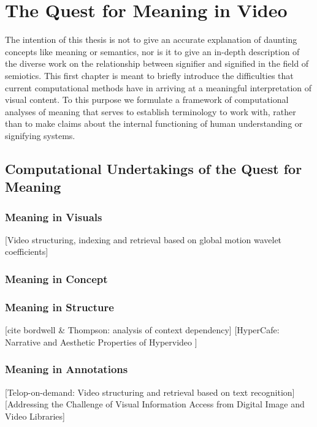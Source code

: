 \chapter{The Quest for Meaning in Video}
\label{ch:quest}

 

The intention of this thesis is not to give an accurate explanation of daunting concepts like meaning or semantics, nor is it to give an in-depth description of the diverse work on the relationship between signifier and signified in the field of semiotics. This first chapter is meant to briefly introduce the difficulties that current computational methods have in arriving at a meaningful interpretation of visual content. To this purpose we formulate a framework of computational analyses of meaning that serves to establish terminology to work with, rather than to make claims about the internal functioning of human understanding or signifying systems.

\section{Computational Undertakings of the Quest for Meaning}

\subsection{Meaning in Visuals}
[Video structuring, indexing and retrieval based on global motion wavelet coefficients]\cite{Bruno:2002tt}

\subsection{Meaning in Concept}
\subsection{Meaning in Structure}
[cite bordwell \& Thompson: analysis of context dependency]
[HyperCafe: Narrative and Aesthetic Properties of Hypervideo \cite{Sawhney:1996tk}]

\subsection{Meaning in Annotations}
[Telop-on-demand: Video structuring and retrieval based on text recognition]\cite{Kuwano:2000wy}
[Addressing the Challenge of Visual Information Access from Digital Image and Video Libraries]\cite{Christel:2005td}

